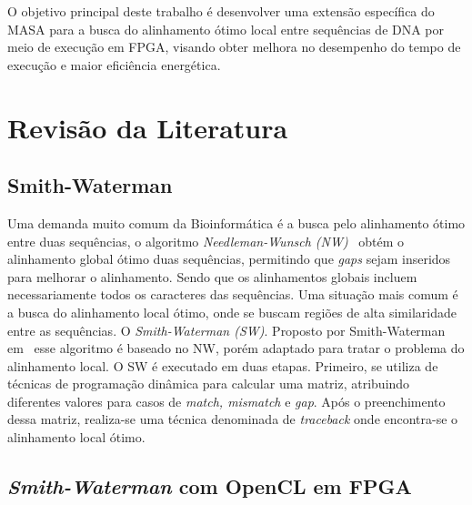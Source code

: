 \documentclass[12pt, a4paper]{article}
\numberwithin{table}{section}
\begin{document}
O objetivo principal deste trabalho é desenvolver uma extensão específica do 
MASA para a busca do alinhamento ótimo local entre sequências de DNA por meio de execução em FPGA, visando obter melhora no desempenho do tempo de 
execução e maior eficiência energética. 

\section{Revisão da Literatura}
\label{sec:revisao}

\subsection{Smith-Waterman}

Uma demanda muito comum da Bioinformática é a busca pelo alinhamento ótimo entre
duas sequências, o algoritmo \textit{Needleman-Wunsch (NW)}~\cite{PMID:5420325}
obtém o alinhamento global 
ótimo duas sequências, permitindo que \textit{gaps} sejam inseridos para melhorar 
o alinhamento. Sendo que os alinhamentos globais incluem necessariamente 
todos os caracteres das sequências.
Uma situação mais comum é a busca do alinhamento local ótimo, onde se buscam regiões
de alta similaridade entre as sequências. O \textit{Smith-Waterman (SW)}.
Proposto por Smith-Waterman em~\cite{SMITH1981195} esse algoritmo é baseado no NW,
porém adaptado para tratar o problema do alinhamento local.
O SW é executado em duas etapas. Primeiro, se utiliza de técnicas de programação 
dinâmica para calcular uma matriz, atribuindo diferentes valores para 
casos de \textit{match, mismatch} e \textit{gap}.
Após o preenchimento dessa matriz, realiza-se uma técnica denominada de \textit{traceback} 
onde encontra-se o alinhamento local ótimo.

\subsection {\textit{Smith-Waterman} com OpenCL em FPGA}
\end{document}
